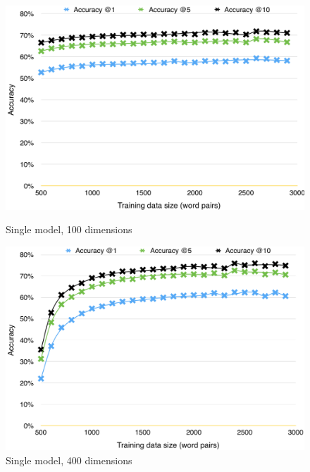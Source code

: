 \begin{figure}[!htb]
    \centering
    \begin{minipage}{\textwidth}
      \centering
      \begin{minipage}{0.45\linewidth}
          \includegraphics[width=\linewidth]{images/single_model_100_dim}
          \caption{Single model, 100 dimensions}
          \label{fig:sm_100}
      \end{minipage}
      \begin{minipage}{0.45\linewidth}
          \includegraphics[width=\linewidth]{images/single_model_400_dim}
          \caption{Single model, 400 dimensions}
          \label{fig:sm_400}
      \end{minipage}
    \end{minipage}
    
    \vspace{8mm}


\end{figure}
